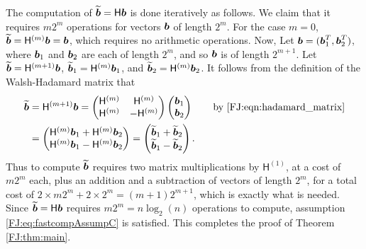 \documentclass[graybox,footinfo]{svmult}
\begin{document}
The computation of $\widetilde{{\boldsymbol{b}}} =\mathsf{H} {\boldsymbol{b}}$ is done iteratively as follows.  We claim that it requires $m2^m$ operations for vectors ${\boldsymbol{b}}$ of length $2^m$. For the case $m=0$, $\widetilde{{\boldsymbol{b}}} = \mathsf{H}^{(m)} {\boldsymbol{b}} = {\boldsymbol{b}}$, which requires no arithmetic operations.  Now, Let ${\boldsymbol{b}} = ({\boldsymbol{b}}_1^{T},  {\boldsymbol{b}}_2^{T})$, where ${\boldsymbol{b}}_1$ and ${\boldsymbol{b}}_2$ are each of length $2^m$, and so ${\boldsymbol{b}}$ is of length $2^{m+1}$.  Let $\widetilde{{\boldsymbol{b}}} = \mathsf{H}^{(m+1)} {\boldsymbol{b}}$,  $\widetilde{{\boldsymbol{b}}}_1 = \mathsf{H}^{(m)} {\boldsymbol{b}}_1$, and $\widetilde{{\boldsymbol{b}}}_2 = \mathsf{H}^{(m)} {\boldsymbol{b}}_2$.  It follows from the definition of the Walsh-Hadamard matrix that 
\begin{align*}
\widetilde{{\boldsymbol{b}}} &= \mathsf{H}^{({m+1})} {\boldsymbol{b}} = \begin{pmatrix}
\mathsf{H}^{(m)} & \mathsf{H}^{(m)} \\ \mathsf{H}^{(m)} & - \mathsf{H}^{(m)}
\end{pmatrix} 
\begin{pmatrix}
{\boldsymbol{b}}_1 \\ {\boldsymbol{b}}_2
\end{pmatrix} \qquad \text{by \eqref{FJ:eqn:hadamard_matrix}} \\
&= 
\begin{pmatrix}
\mathsf{H}^{(m)} {\boldsymbol{b}}_1 + \mathsf{H}^{(m)}{\boldsymbol{b}}_2 \\ 
\mathsf{H}^{(m)} {\boldsymbol{b}}_1 - \mathsf{H}^{(m)} {\boldsymbol{b}}_2
\end{pmatrix}
= 
\begin{pmatrix}
\widetilde{{\boldsymbol{b}}}_1 + \widetilde{{\boldsymbol{b}}}_2 \\ 
\widetilde{{\boldsymbol{b}}}_1 - \widetilde{{\boldsymbol{b}}}_2
\end{pmatrix}.
\end{align*}
Thus to compute $\widetilde{{\boldsymbol{b}}}$ requires two matrix multiplications by $\mathsf{H}^{(1)}$, at a cost of $m 2^m$ each, plus an addition and a subtraction of vectors of length $2^m$, for a total cost of $2 \times m 2^m + 2 \times 2^m = (m+1) 2^{m+1}$, which is exactly what is needed.  Since $\widetilde{{\boldsymbol{b}}} =\mathsf{H} {\boldsymbol{b}}$ requires $m2^m = n \log_2(n)$ operations to compute, assumption \eqref{FJ:eq:fastcompAssumpC} is satisfied.  This completes the proof of Theorem \ref{FJ:thm:main}.






%
\end{document}
